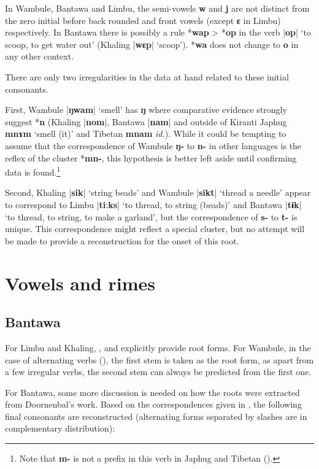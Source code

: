 \documentclass[oneside,a4paper,11pt]{article}
\newcommand{\ipa}[1]{\textbf{{\phon\mbox{#1}}}} %
\newcommand{\dhatu}[2]{|\ipa{#1}| `#2'}
\begin{document}
In Wambule, Bantawa and Limbu, the semi-vowels \ipa{w} and \ipa{j} are not distinct from the zero initial before back rounded and front vowels (except \ipa{ɛ} in Limbu) respectively. In Bantawa there is possibly a rule *\ipa{wap} > *\ipa{op} in the verb \dhatu{op}{to scoop, to get water out} (Khaling \dhatu{wɛp}{scoop}). *\ipa{wa} does not change to \ipa{o} in any other context.

There are only two irregularities in the data at hand related to these initial consonants.

First, Wambule \dhatu{ŋwam}{smell} has \ipa{ŋ} where comparative evidence strongly suggest *\ipa{n} (Khaling |\ipa{nom}|, Bantawa  |\ipa{nam}| and outside of Kiranti Japhug \ipa{mnɤm} `smell (it)' and Tibetan \ipa{mnam} \textit{id.}). While it could be tempting to assume that the correspondence of Wambule \ipa{ŋ-} to \ipa{n-} in other languages is the reflex of the cluster *\ipa{mn-}, this hypothesis is better left aside until confirming data is found.\footnote{Note that \ipa{m-} is not a prefix in this verb in Japhug and Tibetan (\citealt{hill14derivational, jacques14snom}).}

Second, Khaling \dhatu{sik}{string beads} and Wambule \dhatu{sikt}{thread a needle} appear to correspond to Limbu \dhatu{tiːks}{to thread, to string (beads)}  and Bantawa \dhatu{tɨk}{to thread, to string, to make a garland}, but the correspondence of \ipa{s-} to \ipa{t-} is unique. This correspondence might reflect a special cluster, but no attempt will be made to provide a reconstruction for the onset of this root.

\section{Vowels and rimes} \label{sec:rhymes}

\subsection{Bantawa} \label{sec:bantawa}
 
 For Limbu and Khaling, \citet{michailovsky02dico}, \citet{jacques12khaling} and \citet{jacques16si} explicitly provide root forms. For Wambule, in the case of alternating verbs (\citealt[255-263]{opgenort04wambule}), the first stem is taken as the root form, as apart from a few irregular verbs, the second stem can always be predicted from the first one.  
 
 For Bantawa, some more discussion is needed on how the roots were extracted from Doornenbal's work. Based on the correspondences given in \citet[129; 132]{doornenbal09}, the following final consonants are reconstructed (alternating forms separated by slashes are in complementary distribution):
\end{document}
